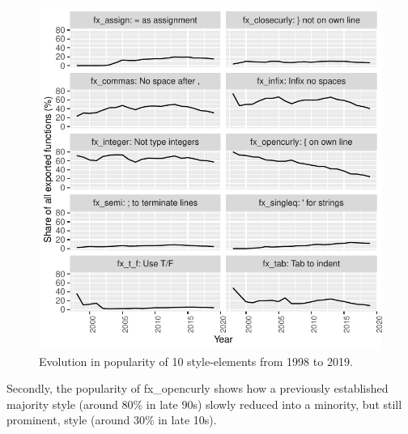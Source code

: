 \begin{figure}[htbp]
  \centering
  \includegraphics{fig1}
  \caption{Evolution in popularity of 10 style-elements from 1998 to 2019.}
  \label{figure:fig1}
\end{figure}


Secondly, the popularity of fx\_opencurly shows how a previously established majority style (around 80\% in late 90s) slowly reduced into a minority, but still prominent, style (around 30\% in late 10s).

